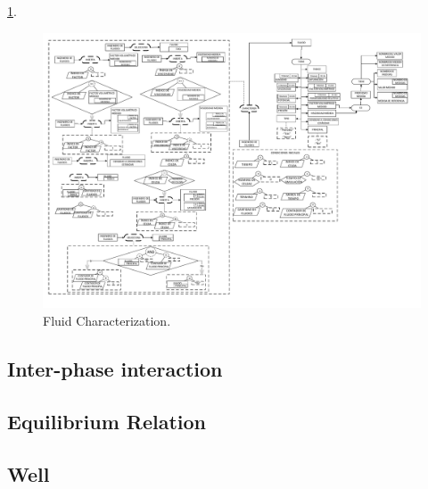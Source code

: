 \ref{fig:Fluid}.\\
\begin{figure}[h]
	\centering%
	\includegraphics[width=0.9\linewidth]{Kap4/Fluid.pdf}%
	\caption{Fluid Characterization.} \label{fig:Fluid}
\end{figure}

\subsection{Inter-phase interaction}\label{sec:PS_Interphase}


\subsection{Equilibrium Relation}\label{sec:PS_Equilibrium}

\subsection{Well}\label{sec:PS_Well}




